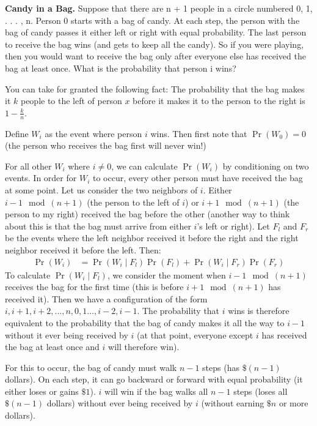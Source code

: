 \documentclass[11pt]{article}
\begin{document}
\begin{exercise}
\textbf{Candy in a Bag.}
Suppose that there are n + 1 people in a circle numbered 0, 1, . . . , n. Person 0 starts with a bag of candy. At each step, the person with the bag of candy passes it either left or right with equal probability. The last person to receive the bag wins (and gets to keep all the candy). So if you were playing, then you would want to receive the bag only after everyone else has received the bag at least once. What is the probability that person i wins?

You can take for granted the following fact: The probability that the bag makes it $k$ people to the left of person $x$ before it makes it to the person to the right is $1 - \frac{k}{n}$.
\end{exercise}
\begin{solution}
Define $W_i$ as the event where person $i$ wins. Then first note that $\Pr(W_0) = 0$ (the person who receives the bag first will never win!)

  For all other $W_i$ where $i \neq 0$, we can calculate $\Pr(W_i)$ by conditioning on two events. In order for $W_i$ to occur, every other person must have received the bag at some point. Let us consider the two neighbors of $i$. Either $i - 1 \mod (n+1)$ (the person to the left of $i$) or $i + 1 \mod (n+1)$ (the person to my right) received the bag before the other (another way to think about this is that the bag must arrive from either $i$'s left or right). Let $F_l$ and $F_r$ be the events where the left neighbor received it before the right and the right neighbor received it before the left. Then:
  \begin{align*}
    \Pr(W_i) &= \Pr(W_i \mid F_l)\Pr(F_l) + \Pr(W_i \mid F_r)\Pr(F_r)
  \end{align*}
  To calculate $\Pr(W_i \mid F_l)$, we consider the moment when $i-1 \mod (n+1)$ receives the bag for the first time (this is before $i+1 \mod (n+1)$ has received it). Then we have a configuration of the form $i, i + 1, i+2, \ldots, n, 0, 1 \ldots, i-2, i-1$. The probability that $i$ wins is therefore equivalent to the probability that the bag of candy makes it all the way to $i-1$ without it ever being received by $i$ (at that point, everyone except $i$ has received the bag at least once and $i$ will therefore win).

  For this to occur, the bag of candy must walk $n-1$ steps (has $\$(n-1)$ dollars). On each step, it can go backward or forward with equal probability (it either loses or gains $\$1$). $i$ will win if the bag walks all $n-1$ steps (loses all $\$(n-1)$ dollars) without ever being received by $i$ (without earning $\$n$ or more dollars).


\end{solution}
\end{document}
